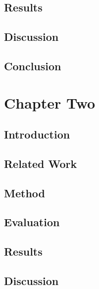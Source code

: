 \documentclass[letterpaper]{polythesis}
\begin{document}
\section{Results}\label{sec:ChapOneResults}


\section{Discussion}\label{sec:ChapOneDiscussion}


\section{Conclusion}\label{sec:ChapOneConclusion}


\chapter{Chapter Two}
\label{ch-2}

\section{Introduction}\label{sec:ChapTwoIntroduction}


\section{Related Work}\label{sec:ChapTwoMotivation}


\section{Method}\label{sec:ChapTwoMethod}


\section{Evaluation}\label{sec:ChapTwoEvaluation}


\section{Results}\label{sec:ChapTwoResults}


\section{Discussion}\label{sec:ChapTwoDiscussion}

\end{document}
